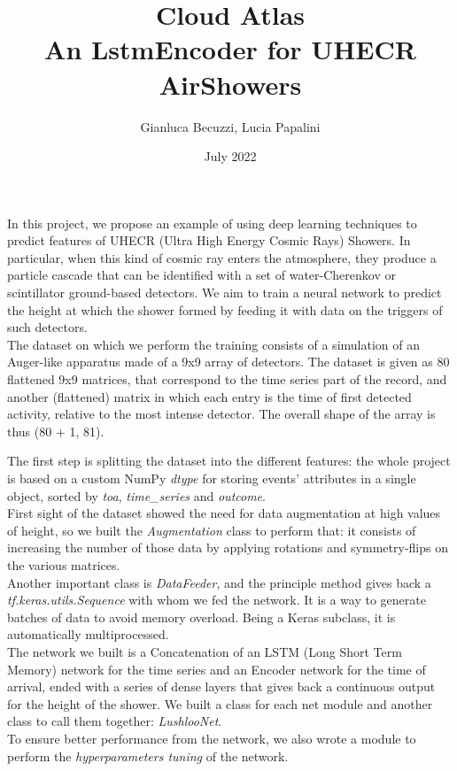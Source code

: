 \documentclass{article}
\title{Cloud Atlas \\[1ex] \large An LstmEncoder for UHECR AirShowers}
\author{Gianluca Becuzzi, Lucia Papalini}
\date{July 2022}
\begin{document}
\maketitle

In this project, we propose an example of using deep learning techniques to predict features of UHECR 
(Ultra High Energy Cosmic Rays) Showers.
In particular, when this kind of cosmic ray enters the atmosphere, they produce a particle cascade 
that can be identified with a set of water-Cherenkov or scintillator ground-based detectors. We aim to train a neural network to predict the height at which the shower formed by feeding it with data on the triggers of such detectors.\\
The dataset on which we perform the training consists of a simulation of an Auger-like apparatus 
made of a 9x9 array of detectors. The dataset is given as 80 flattened 9x9 matrices, that correspond to the time series part of the record, and another (flattened) matrix
in which each entry is the time of first detected activity, relative to the most intense detector.
The overall shape of the array is thus (80 + 1, 81).

The first step is splitting the dataset into the different features: the whole project is based on a custom NumPy \textit{dtype} for storing events' attributes in a single object, sorted by \textit{toa}, \textit{time\_series} and \textit{outcome}.\\
First sight of the dataset showed the need for data augmentation at high values of height, so we built the \textit{Augmentation} class to perform that: it consists of increasing the number of those data by applying rotations and symmetry-flips on the various matrices.\\
Another important class is \textit{DataFeeder}, and the principle method gives back a \textit{tf.keras.utils.Sequence} 
with whom we fed the network. It is a way to generate batches of data to avoid memory overload. Being a Keras subclass, it is automatically multiprocessed.\\
The network we built is a Concatenation of an LSTM (Long Short Term Memory) network for the time series and an Encoder network for the time of arrival, ended with a series of dense layers that gives back a continuous output for the height of the shower. We built a class for each net module and another class to call them together: \textit{LushlooNet}.\\
To ensure better performance from the network, we also wrote a module to perform the \textit{hyperparameters tuning} of the network.
\end{document}
